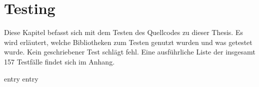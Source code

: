 \chapter{Testing}
\label{chap:testing}

Diese Kapitel befasst sich mit dem Testen des Quellcodes zu dieser Thesis.  Es
wird erläutert, welche Bibliotheken zum Testen genutzt wurden und was getestet
wurde.  Kein geschriebener Test schlägt fehl.  Eine ausführliche Liste der
insgesamt 157 Testfälle findet sich im Anhang.

{entry}
{entry}
